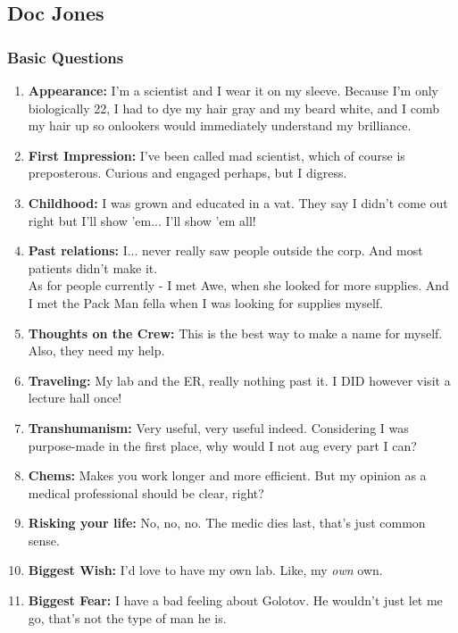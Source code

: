 \def\pfcname{Doc Jones}
\subsection{\pfcname}
\subsubsection{Basic Questions}
\begin{enumerate}
	\setlength\itemsep{-8mm}
	\item
		\textbf{Appearance:}
		I'm a scientist and I wear it on my sleeve.
		Because I'm only biologically 22, I had to dye my hair gray and my beard white,
		and I comb my hair up so onlookers would immediately understand my brilliance.
	\item
		\textbf{First Impression:}
		I've been called mad scientist, which of course is preposterous.
		Curious and engaged perhaps, but I digress.
	\item
		\textbf{Childhood:}
		I was grown and educated in a vat.
		They say I didn't come out right but I'll show 'em... I'll show 'em all!
	\item
		\textbf{Past relations:}
		I... never really saw people outside the corp.
		And most patients didn't make it.
		\\%
		As for people currently - I met Awe, when she looked for more supplies.
		And I met the Pack Man fella when I was looking for supplies myself.
	\item
		\textbf{Thoughts on the Crew:}
		This is the best way to make a name for myself.
		Also, they need my help.
	\item
		\textbf{Traveling:}
		My lab and the ER, really nothing past it.
		I DID however visit a lecture hall once!
	\item
		\textbf{Transhumanism:}
		Very useful, very useful indeed.
		Considering I was purpose-made in the first place,
		why would I not aug every part I can?
	\item
		\textbf{Chems:}
		Makes you work longer and more efficient.
		But my opinion as a medical professional should be clear, right?
	\item
		\textbf{Risking your life:}
		No, no, no.
		The medic dies last, that's just common sense.
	\item
		\textbf{Biggest Wish:}
		I'd love to have my own lab.
		Like, my \textit{own} own.
	\item
		\textbf{Biggest Fear:}
		I have a bad feeling about Golotov.
		He wouldn't just let me go, that's not the type of man he is.

\end{enumerate}
